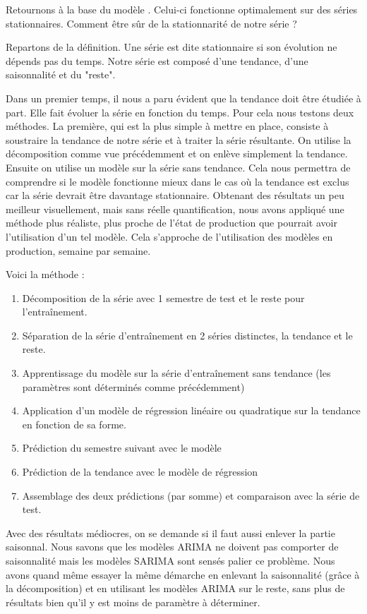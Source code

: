 Retournons à la base du modèle \ARIMA. Celui-ci fonctionne optimalement sur des séries stationnaires. Comment être sûr de la stationnarité de notre série ?

Repartons de la définition. Une série est dite stationnaire si son évolution ne dépends pas du temps. Notre série est composé d'une tendance, d'une saisonnalité et du "reste".

Dans un premier temps, il nous a paru évident que la tendance doit être étudiée à part. Elle fait évoluer la série en fonction du temps. Pour cela nous testons deux méthodes. La première, qui est la plus simple à mettre en place, consiste à soustraire la tendance de notre série et à traiter la série résultante. On utilise la décomposition 
comme vue précédemment et on enlève simplement la tendance. Ensuite on utilise un modèle \SARIMA sur la série sans tendance. Cela nous permettra de comprendre si le modèle fonctionne mieux dans le cas où la tendance est exclus car la série devrait être davantage stationnaire. 
Obtenant des résultats un peu meilleur visuellement, mais sans réelle quantification, nous avons appliqué une méthode plus réaliste, plus proche de l'état de production que pourrait avoir l'utilisation d'un tel modèle. Cela s'approche de l'utilisation des modèles en production, semaine par semaine.

Voici la méthode :
\begin{enumerate}
    \item Décomposition de la série avec 1 semestre de test et le reste pour l'entraînement.
    \item Séparation de la série d'entraînement en 2 séries distinctes, la tendance et le reste.
    \item Apprentissage du modèle \SARIMA sur la série d'entraînement sans tendance (les paramètres sont déterminés comme précédemment)
    \item Application d'un modèle de régression linéaire ou quadratique sur la tendance en fonction de sa forme.
    \item Prédiction du semestre suivant avec le modèle \SARIMA 
    \item Prédiction de la tendance avec le modèle de régression
    \item Assemblage des deux prédictions (par somme) et comparaison avec la série de test.
\end{enumerate}


Avec des résultats médiocres, on se demande si  il faut aussi enlever la partie saisonnal. Nous savons que les modèles ARIMA ne doivent pas comporter de saisonnalité mais les modèles SARIMA sont sensés palier ce problème. Nous avons quand même essayer la même démarche en enlevant la saisonnalité (grâce à la décomposition) et en utilisant les modèles ARIMA sur le reste, sans plus de résultats bien qu'il y est moins de paramètre à déterminer. 

